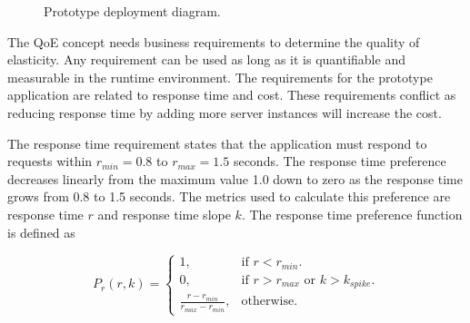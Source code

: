 \documentclass[english]{tktltiki2}
\theoremstyle{definition}
\theoremstyle{remark}
\begin{document}
\begin{figure}[h]
	\centerline{
	}
	\caption{Prototype deployment diagram.}
	\label{fig:deploymentDiagram}
\end{figure}


The QoE concept needs business requirements to determine the quality of
elasticity. Any requirement can be used as long as it is quantifiable and
measurable in the runtime environment. The requirements for the prototype
application are related to response time and cost. These requirements conflict
as reducing response time by adding more server instances will increase the
cost.

The response time requirement states that the application must respond to
requests within $r_{min} = 0.8$ to $r_{max} = 1.5$
seconds. The response time preference decreases linearly from the maximum value
1.0 down to zero as the response time grows from 0.8 to 1.5 seconds. The metrics used to calculate this preference are response time $r$ and response
time slope $k$. The response time preference function is defined as  

\begin{equation}
P_{r}(r, k) = \begin{cases}
    1, & \text{if $r < r_{min}$}.\\
    0, & \text{if $r > r_{max}$ or $k > k_{spike}$}.\\
    \frac{r - r_{min}}
    	 {r_{max} - r_{min}}, & \text{otherwise}.
  \end{cases}
  \label{eq:responseTimePreference}
\end{equation}
\end{document}
